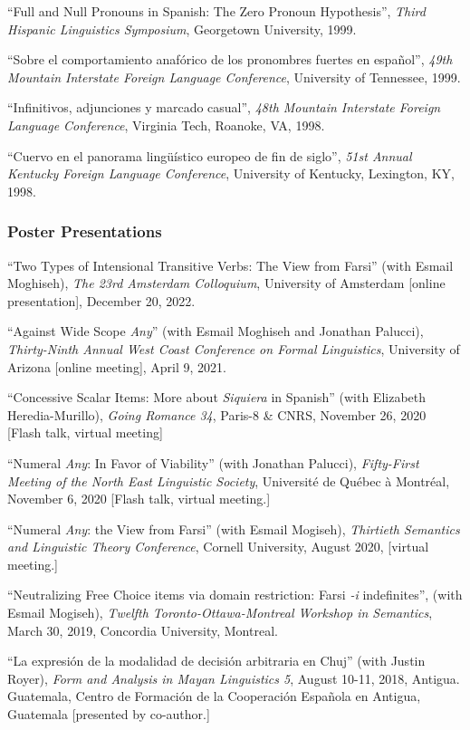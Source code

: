 \documentclass[11pt]{article}
\begin{document}
``Full and Null Pronouns in Spanish: The Zero Pronoun Hypothesis'', \textit{Third Hispanic Linguistics Symposium}, Georgetown University, 1999. 

``Sobre el comportamiento anaf\'orico de los pronombres fuertes en espa\~nol'', \textit{49th Mountain Interstate Foreign Language Conference}, University of Tennessee, 1999. 

``Infinitivos, adjunciones y marcado casual'', \textit{48th Mountain Interstate Foreign Language Conference}, Virginia Tech, Roanoke, VA, 1998. 

``Cuervo en el panorama ling\"{u}\'istico europeo de fin de siglo'', \textit{51st Annual Kentucky Foreign Language Conference}, University of Kentucky, Lexington, KY, 1998. 

\subsubsection*{Poster Presentations}

``Two Types of Intensional Transitive Verbs: The View from Farsi'' (with Esmail Moghiseh), \textit{The 23rd Amsterdam Colloquium}, University of Amsterdam [online presentation], December 20, 2022.

``Against Wide Scope \textit{Any}'' (with Esmail Moghiseh and Jonathan Palucci), \textit{Thirty-Ninth Annual West Coast Conference on Formal Linguistics}, University of Arizona [online meeting], April 9, 2021.

``Concessive Scalar Items: More about \textit{Siquiera} in Spanish'' (with Elizabeth Heredia-Murillo),
\textit{Going Romance 34}, Paris-8 \& CNRS, November 26, 2020 [Flash talk, virtual meeting]

``Numeral
\textit{Any}: In Favor of Viability'' (with Jonathan Palucci),  \textit{Fifty-First Meeting of the
  North East Linguistic Society}, Universit\'e de Qu\'ebec \`a
Montr\'eal, November 6, 2020 [Flash talk, virtual meeting.]

``Numeral \textit{Any}: the View from Farsi'' (with Esmail Mogiseh), \textit{Thirtieth Semantics and Linguistic Theory Conference}, Cornell University, August 2020, [virtual meeting.]

``Neutralizing Free Choice items via domain restriction: Farsi \textit{-i} indefinites'', (with Esmail Mogiseh), \textit{Twelfth Toronto-Ottawa-Montreal Workshop in Semantics}, March 30, 2019, Concordia University, Montreal.

``La expresi\'on de la modalidad de decisi\'on arbitraria en Chuj'' (with Justin Royer), \textit{Form and Analysis in Mayan Linguistics 5}, August 10-11, 2018, Antigua. Guatemala, Centro de Formaci\'on de la Cooperaci\'on Espa\~nola en Antigua, Guatemala [presented by co-author.]
\end{document}
